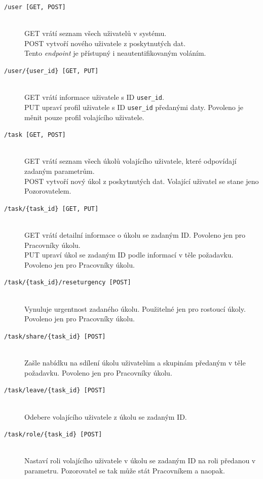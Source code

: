 \documentclass[thesis=B,czech]{FITthesis}[2012/06/26]
\newcommand{\forworkers}{Povoleno jen pro Pracovníky úkolu.}
\begin{document}
			\begin{description}			
			\item[\texttt{/user [GET, POST]}] \hfill \\
				GET vrátí seznam všech uživatelů v systému. \\
				POST vytvoří nového uživatele z poskytnutých dat. \\
				
				Tento \textit{endpoint} je přístupný i neautentifikovaným voláním.
				
			\item[\texttt{/user/\{user\_id\} [GET, PUT]}] \hfill \\
				GET vrátí informace uživatele s ID \texttt{user\_id}. \\
				PUT upraví profil uživatele s ID \texttt{user\_id} předanými daty. Povoleno je měnit pouze profil volajícího uživatele.
			
			\item[\texttt{/task [GET, POST]}] \hfill \\
				GET vrátí seznam všech úkolů volajícího uživatele, které odpovídají zadaným parametrům. \\
				POST vytvoří nový úkol z poskytnutých dat. Volající uživatel se stane jeno Pozorovatelem.
			
			\item[\texttt{/task/\{task\_id\} [GET, PUT]}] \hfill \\
				GET vrátí detailní informace o úkolu se zadaným ID. \forworkers \\
				PUT upraví úkol se zadaným ID podle informací v těle požadavku. \forworkers
			
			\item[\texttt{/task/\{task\_id\}/reseturgency [POST]}] \hfill \\
				Vynuluje urgentnost zadaného úkolu. Použitelné jen pro rostoucí úkoly. \forworkers
			
			\item[\texttt{/task/share/\{task\_id\} [POST]}] \hfill \\
				Zašle nabídku na sdílení úkolu uživatelům a skupinám předaným v těle požadavku. \forworkers
			
			\item[\texttt{/task/leave/\{task\_id\} [POST]}] \hfill \\
				Odebere volajícího uživatele z úkolu se zadaným ID. 
			
			\item[\texttt{/task/role/\{task\_id\} [POST]}] \hfill \\
				Nastaví roli volajícího uživatele v úkolu se zadaným ID na roli předanou v parametru. Pozorovatel se tak může stát Pracovníkem a naopak. 
				

\end{description}
\end{document}
